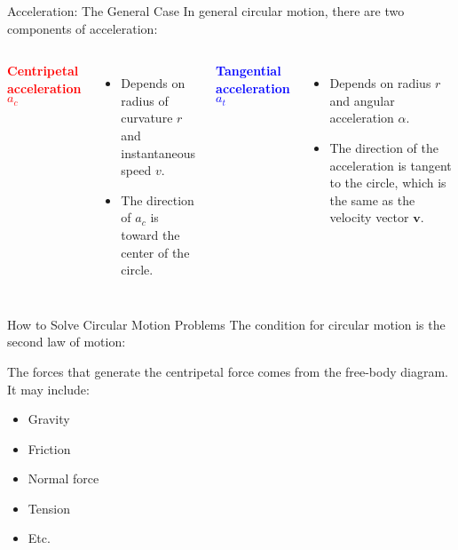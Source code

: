 \documentclass[12pt,compress,aspectratio=169]{beamer}
\begin{document}
\begin{frame}{Acceleration: The General Case}
  In general circular motion, there are two components of acceleration:
  \vspace{.2in}
  \begin{columns}
    
    \textcolor{red}{\textbf{Centripetal acceleration} $a_c$}
    \begin{itemize}
    \item Depends on radius of curvature $r$ and instantaneous speed $v$.
    \item The direction of $a_c$ is toward the center of the circle.
    \end{itemize}
    \textcolor{blue}{\textbf{Tangential acceleration} $a_t$}
    \begin{itemize}
    \item Depends on radius $r$  and angular acceleration $\alpha$.
    \item The direction of the acceleration is tangent to the circle, which
      is the same as the velocity vector $\bm{v}$.
    \end{itemize}
  \end{columns}
\end{frame}



\begin{frame}{How to Solve Circular Motion Problems}
  The condition for circular motion is the second law of motion:

  
  The forces that generate the centripetal force comes from the free-body
  diagram. It may include:
  \begin{itemize}
  \item Gravity
  \item Friction
  \item Normal force
  \item Tension
  \item Etc.
  \end{itemize}
\end{frame}
\end{document}
